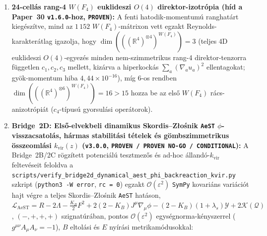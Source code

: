 \documentclass[11pt,a4paper]{article}
\begin{document}
\begin{enumerate}
    (iii)~a haló-virializáció erősen szabályozza a nemlineáris skálákat (1.\ bin Halofit-emelés $+47\%$ $\ell=100$-nál): $k_{\mathrm{vir}} = 0{,}30$ vagy $0{,}15\;\mathrm{Mpc}^{-1}$ levágással a globális \texttt{DES}-eltolás $S_8^{\Lambda\mathrm{CDM}} = 0{,}8184\text{--}0{,}8203$-ra zsugorodik, de a \textbf{IV.\ generációs \texttt{Euclid}} az összes 21 auto+kereszt-spektrumon még így is szétválasztja a $c_S = 0$ tomográfiai dőlést a lapos $c_S = 1$-től: \textbf{$16{,}05\sigma / 5{,}34\sigma / 4{,}28\sigma$} (\texttt{allk}, teljes $\ell\in[30,1000]$ / kvázilineáris $\ell\le 150$ / szigorúan lineáris $k\le 0{,}15\;\mathrm{Mpc}^{-1}$), \textbf{$5{,}79\sigma / 3{,}87\sigma / 3{,}62\sigma$} ($k_{\mathrm{vir}}=0{,}30$) és \textbf{$3{,}93\sigma / 2{,}96\sigma / 2{,}89\sigma$} ($k_{\mathrm{vir}}=0{,}15$, rögzített kozmológiájú felső korlát), míg az adversariális monoton $\bar{N}$ \emph{felfelé} tolja $S_8$-at ($0{,}8341$, $+3{,}45\sigma$ a \texttt{DES Y3} ellen).
    \item \textbf{24-cellás rang-4 $W(F_4)$ euklideszi $O(4)$ direktor-izotrópia (híd a Paper~30 \texttt{v1.6.0}-hoz, \texttt{PROVEN}):}
    A fenti hatodik-momentumú ranghatárt kiegészítve, mind az $1\,152$ $W(F_4)$-mátrixon vett egzakt Reynolds-karakterátlag igazolja, hogy $\dim(((\mathbb{R}^4)^{\otimes 4})^{W(F_4)}) = 3$ (teljes 4D euklideszi $O(4)$-egyezés minden nem-szimmetrikus rang-4 direktor-tenzorra független $c_1, c_2, c_3$ mellett, kizárva a hiperkockás $\sum_a(\nabla_a u_a)^2$ ellentagokat; gyök-momentum hiba $4{,}44\times 10^{-16}$), míg 6-os rendben $\dim(((\mathbb{R}^4)^{\otimes 6})^{W(F_4)}) = 16 > 15$ hozza be az első $W(F_4)$ rács-anizotrópiát ($c_4$-típusú gyorsulási operátorok).
    \item \textbf{Bridge~2D: Első-elvekbeli dinamikus Skordis--Z{\l}o\'snik \texttt{AeST} $\phi$-visszacsatolás, hármas stabilitási tételek és gömbszimmetrikus összeomlási $k_{\mathrm{vir}}(z)$ (\texttt{v3.0.0}, \texttt{PROVEN / PROVEN NO-GO / CONDITIONAL}):}
    A Bridge~2B/2C rögzített potenciálú tesztmezős és ad-hoc állandó-$k_{\mathrm{vir}}$ feltevéseit feloldva a \texttt{scripts/\allowbreak verify\_\allowbreak bridge2d\_\allowbreak dynamical\_\allowbreak aest\_\allowbreak phi\_\allowbreak backreaction\_\allowbreak kvir.py} szkript (\texttt{python3 -W error}, \texttt{rc = 0}) egzakt $\mathcal{O}(\varepsilon^2)$ \texttt{SymPy} kovariáns variációt hajt végre a teljes Skordis--Z{\l}o\'snik \texttt{AeST} hatáson, $\mathcal{L}_{\mathrm{AeST}} = R - 2\Lambda - \frac{K_B}{2}F^2 + 2(2-K_B)J^\mu\nabla_\mu\phi - (2-K_B)(1+\lambda_s)\mathcal{Y} + 2\mathcal{K}(\mathcal{Q})$, $(-,+,+,+)$ szignatúrában, pontos $\mathcal{O}(\varepsilon^2)$ egységnorma-kényszerrel ($g^{\mu\nu}A_\mu A_\nu = -1$), $B$ eltolási és $E$ nyírási metrikamódusokkal:

\end{enumerate}
\end{document}
